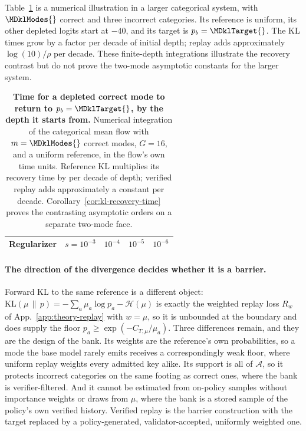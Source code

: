Table~\ref{tab:kl-recovery} is a numerical illustration in a larger
categorical system, with $\MDklModes{}$ correct and three incorrect categories.
Its reference is uniform, its other depleted logits start at $-40$, and its
target is $p_b=\MDklTarget{}$. The KL times grow by a factor
\MDklDecadeKL{} per decade of initial depth; replay adds approximately
$\log(10)/\rho$ per decade. These finite-depth integrations illustrate the
recovery contrast but do not prove the two-mode asymptotic constants for
the larger system.

\begin{table}[t]
  \centering
  \caption{\textbf{Time for a depleted correct mode to return to
  $p_b=\MDklTarget{}$, by the depth it starts from.} Numerical integration of
  the categorical mean flow with $m=\MDklModes{}$ correct modes, $G=16$, and a
  uniform reference, in the flow's own time units. Reference KL multiplies its
  recovery time by \MDklDecadeKL{} per decade of depth; verified replay adds
  approximately a constant per decade. Corollary~\ref{cor:kl-recovery-time}
  proves the contrasting asymptotic orders on a separate two-mode face.}
  \label{tab:kl-recovery}
  \small
  \setlength{\tabcolsep}{6pt}
  \begin{tabular}{@{}lrrrr@{}}
    \toprule
    \textbf{Regularizer} & $s=10^{-3}$ & $10^{-4}$ & $10^{-5}$ & $10^{-6}$ \\
    \midrule
    
  \end{tabular}
\end{table}

\paragraph{The direction of the divergence decides whether it is a barrier.}
Forward KL to the same reference is a different object:
$\mathrm{KL}(\mu\,\|\,p)=-\sum_a\mu_a\log p_a-\mathcal H(\mu)$ is exactly the
weighted replay loss $R_w$ of
App.~\ref{app:theory-replay} with $w=\mu$, so it is unbounded at the
boundary and does supply the floor $p_a\ge\exp(-C_{T,\mu}/\mu_a)$. Three
differences remain, and they are the design of the bank. Its weights are the
reference's own probabilities, so a mode the base model rarely emits receives
a correspondingly weak floor, where uniform replay weights every admitted key
alike. Its support is all of $\mathcal A$, so it protects incorrect categories
on the same footing as correct ones, where the bank is verifier-filtered.
And it cannot be estimated from on-policy samples without importance weights or
draws from $\mu$, where the bank is a stored sample of the policy's own
verified history. Verified replay is the barrier construction with the target
replaced by a policy-generated, validator-accepted, uniformly weighted one.

